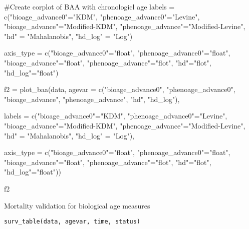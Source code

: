 \documentclass[a4paper]{book}
\begin{document}
\begin{Examples}
\begin{ExampleCode}
#Create corplot of BAA with chronologicl age
labels = c("bioage_advance0"="KDM\nBiological\nAge",
           "phenoage_advance0"="Levine\nPhenotypic\nAge",
           "bioage_advance"="Modified-KDM\nBiological\nAge",
           "phenoage_advance"="Modified-Levine\nPhenotypic\nAge",
           "hd" = "Mahalanobis\nDistance",
           "hd_log" = "Log\nMahalanobis\nDistance")

axis_type = c("bioage_advance0"="float",
              "phenoage_advance0"="float",
              "bioage_advance"="float",
              "phenoage_advance"="flot",
              "hd"="flot",
              "hd_log"="float")

f2 = plot_baa(data,
              agevar = c("bioage_advance0",
                            "phenoage_advance0",
                            "bioage_advance",
                            "phenoage_advance",
                            "hd",
                            "hd_log"),

              labels = c("bioage_advance0"="KDM\nBiological\nAge",
                         "phenoage_advance0"="Levine\nPhenotypic\nAge",
                         "bioage_advance"="Modified-KDM\nBiological\nAge",
                         "phenoage_advance"="Modified-Levine\nPhenotypic\nAge",
                         "hd" = "Mahalanobis\nDistance",
                         "hd_log" = "Log\nMahalanobis\nDistance"),

              axis_type = c("bioage_advance0"="float",
                            "phenoage_advance0"="float",
                            "bioage_advance"="float",
                            "phenoage_advance"="flot",
                            "hd"="flot",
                            "hd_log"="float"))

f2

\end{ExampleCode}
\end{Examples}
%
\begin{Description}\relax
Mortality validation for biological age measures
\end{Description}
%
\begin{Usage}
\begin{verbatim}
surv_table(data, agevar, time, status)
\end{verbatim}
\end{Usage}
%
\end{document}
